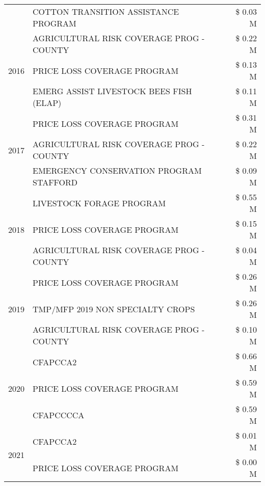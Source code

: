 \begin{tabular}{llr}
 & COTTON TRANSITION ASSISTANCE PROGRAM & \$ 0.03 M \\
\cline{1-3}
\multirow[t]{3}{*}{2016} & AGRICULTURAL RISK COVERAGE PROG - COUNTY & \$ 0.22 M \\
 & PRICE LOSS COVERAGE PROGRAM & \$ 0.13 M \\
 & EMERG ASSIST LIVESTOCK BEES FISH (ELAP) & \$ 0.11 M \\
\cline{1-3}
\multirow[t]{3}{*}{2017} & PRICE LOSS COVERAGE PROGRAM & \$ 0.31 M \\
 & AGRICULTURAL RISK COVERAGE PROG - COUNTY & \$ 0.22 M \\
 & EMERGENCY CONSERVATION PROGRAM STAFFORD & \$ 0.09 M \\
\cline{1-3}
\multirow[t]{3}{*}{2018} & LIVESTOCK FORAGE PROGRAM & \$ 0.55 M \\
 & PRICE LOSS COVERAGE PROGRAM & \$ 0.15 M \\
 & AGRICULTURAL RISK COVERAGE PROG - COUNTY & \$ 0.04 M \\
\cline{1-3}
\multirow[t]{3}{*}{2019} & PRICE LOSS COVERAGE PROGRAM & \$ 0.26 M \\
 & TMP/MFP 2019 NON SPECIALTY CROPS & \$ 0.26 M \\
 & AGRICULTURAL RISK COVERAGE PROG - COUNTY & \$ 0.10 M \\
\cline{1-3}
\multirow[t]{3}{*}{2020} & CFAPCCA2 & \$ 0.66 M \\
 & PRICE LOSS COVERAGE PROGRAM & \$ 0.59 M \\
 & CFAPCCCCA & \$ 0.59 M \\
\cline{1-3}
\multirow[t]{2}{*}{2021} & CFAPCCA2 & \$ 0.01 M \\
 & PRICE LOSS COVERAGE PROGRAM & \$ 0.00 M \\
\cline{1-3}
\bottomrule
\end{tabular}
